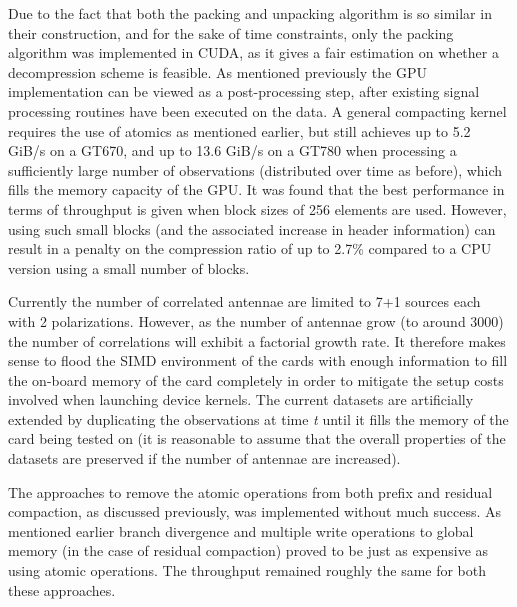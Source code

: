   Due to the fact that both the packing and unpacking algorithm is so similar in their construction, and for the sake of time constraints, only the packing algorithm was implemented in CUDA, as it 
  gives a fair estimation on whether a decompression scheme is feasible. As mentioned previously the GPU implementation can be viewed as a post-processing step, after existing signal processing 
  routines have been executed on the data. A general compacting kernel requires the use of atomics as mentioned earlier, but still achieves up to 5.2 GiB/s on a GT670, and up to 13.6 GiB/s on a 
  GT780 when processing a sufficiently large number of observations (distributed over time as before), which fills the memory capacity of the GPU. It was found that the best performance in terms 
  of throughput is given when block sizes of 256 elements are used. However, using such small blocks (and the associated increase in header information) can result in a penalty on the compression 
  ratio of up to 2.7\% compared to a CPU version using a small number of blocks.
  
  Currently the number of correlated antennae are limited to 7+1 sources each with 2 polarizations. However, as the number of antennae grow (to around 3000) the number of correlations will exhibit 
  a factorial growth rate. It therefore makes sense to flood the SIMD environment of the cards with enough information to fill the on-board memory of the card completely in order to mitigate the setup 
  costs involved when launching device kernels. The current datasets are artificially extended by duplicating the observations at time \textit{t} until it fills the memory of the card being tested on 
  (it is reasonable to assume that the overall properties of the datasets are preserved if the number of antennae are increased).
  
  The approaches to remove the atomic operations from both prefix and residual compaction, as discussed previously, was implemented without much success. As mentioned earlier branch divergence and multiple
  write operations to global memory (in the case of residual compaction) proved to be just as expensive as using atomic operations. The throughput remained roughly the same for both these approaches.
  
